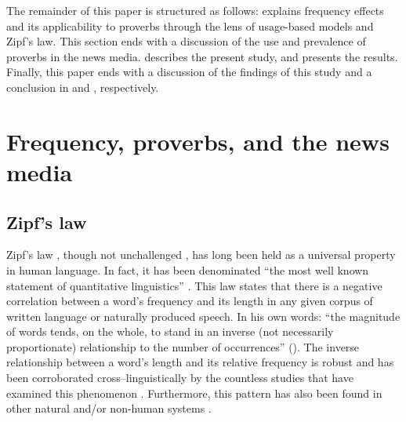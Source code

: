 \documentclass[output=paper,colorlinks,citecolor=brown,draftmode]{langscibook}
\begin{document}
The remainder of this paper is structured as follows:  explains frequency effects and its applicability to proverbs through the lens of usage-based models and Zipf's law. This section ends with a discussion of the use and prevalence of proverbs in the news media.  describes the present study, and  presents the results. Finally, this paper ends with a discussion of the findings of this study and a conclusion in  and , respectively.

\section{Frequency, proverbs, and the news media}\label{sec:lit}

\subsection{Zipf's law}

Zipf's law \citep{zipf1936psychobiology,zipf1949human}, though not unchallenged \citep[see for example][]{bentz2016zipf}, has long been held as a universal property in human language. In fact, it has been denominated ``the most well known statement of quantitative linguistics'' \parencite[1]{montemurro2001beyond}. This law states that there is a negative correlation between a word's frequency and its length in any given corpus of written language or naturally produced speech. In his own words: ``the magnitude of words tends, on the whole, to stand in an inverse (not necessarily proportionate) relationship to the number of occurrences'' (\citeyear[25]{zipf1936psychobiology}). The inverse relationship between a word's length and its relative frequency is robust and has been corroborated cross--linguistically by the countless studies that have examined this phenomenon \citep[e.g.][]{bates2003timed,ferrer2013failure,piantadosi2011word,strauss2007word,wimmer1994towards,zipf1949human}. Furthermore, this pattern has also been found in other natural and/or non-human systems \citep[e.g. data with variable sequence length, music, computer systems, etc.,][]{aitchison2016zipf}.
\end{document}

